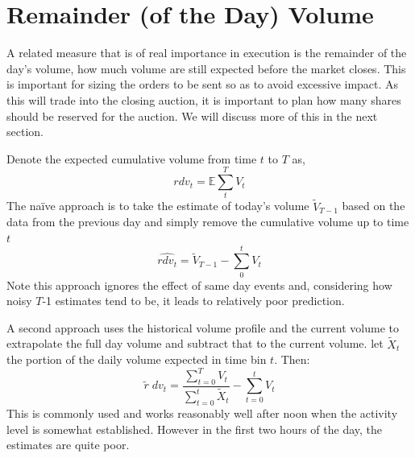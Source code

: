 \section{Remainder (of the Day) Volume}

A related measure that is of real importance in execution is the remainder of the day's volume, how much volume are still expected before the market closes. This is important for sizing the orders to be sent so as to avoid excessive impact. As this will trade into the closing auction, it is important to plan how many shares should be reserved for the auction. We will discuss more of this in the next section.


Denote the expected cumulative volume from time $t$ to $T$ as,
	\begin{equation}\label{eq:rdv_1}
		rdv_t = \mathbb{E} \sum_t^T V_t
	\end{equation}
The na\"ive approach is to take the estimate of today's volume $\tilde{V}_{T-1}$  based on the data from the previous day and simply remove the cumulative volume up to time $t$
	\begin{equation}\label{eq:rdv_2}
		\widehat{rdv_t}=  \tilde{V}_{T-1} - \sum_0^t V_t
	\end{equation}
Note this approach ignores the effect of same day events and, considering how noisy $T$-1 estimates tend to be, it leads to relatively poor prediction.


A second approach uses the historical volume profile and the current volume to extrapolate the full day volume and subtract that to the current volume. let $\tilde{X}_t$ the portion of the daily volume expected in time bin $t$. Then:
	\begin{equation}\label{eq:rdv_3}
		\tilde{r} \; dv_t= \dfrac{\sum_{t=0}^T V_t }{\sum_{t=0}^t \tilde{X}_t} - \sum_{t=0}^t V_t
	\end{equation}
This is commonly used and works reasonably well after noon when the activity level is somewhat established. However in the first two hours of the day, the estimates are quite poor.



